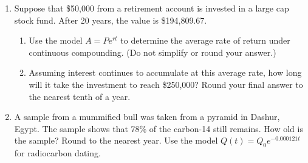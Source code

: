 


\begin{enumerate}
\item Suppose that \$50,000 from a retirement account is invested in a large cap stock fund.  After 20 years, the value is \$194,809.67.
\begin{enumerate}
\item Use the model $A=Pe^{rt}$ to determine the average rate of return under continuous compounding. (Do not simplify or round your answer.)
\vfill
\item  Assuming interest continues to accumulate at this average rate, how long will it take the investment to reach \$250,000?  Round your final answer to the nearest tenth of a year.
\vfill


\end{enumerate}

\newpage

\item  A sample from a mummified bull was taken from a pyramid in Dashur, Egypt.  The sample shows that 78\% of the carbon-14 still remains.  How old is the sample?  Round to the nearest year.  Use the model $Q(t)=Q_0e^{-0.000121t}$ for radiocarbon dating.



\end{enumerate}



